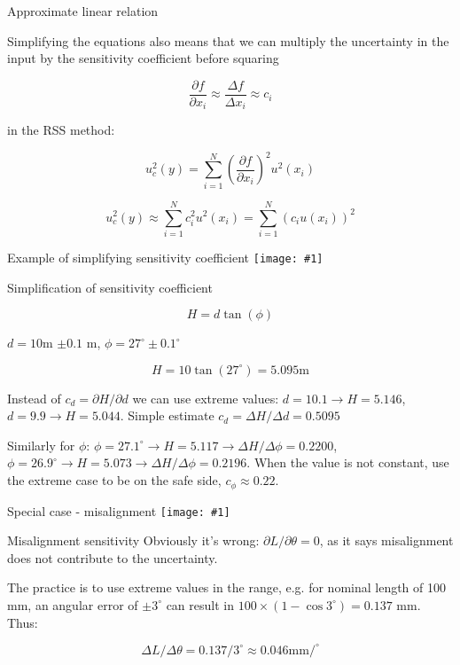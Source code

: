 \documentclass[12pt]{beamer}
\newcommand{\fig}[1]{\centering\texttt{[image: \#1]}}
\begin{document}
\begin{frame}{Approximate linear relation}

Simplifying the equations also means that we can multiply the uncertainty in the input by the sensitivity coefficient before squaring

\[ \frac{\partial f}{\partial x_i} \approx \frac{\Delta f}{\Delta x_i} \approx c_i \]

in the RSS method:

\[ u_c^2(y) = \sum\limits_{i=1}^{N} \left( \frac{\partial f}{\partial x_i} \right)^2 u^2(x_i) \]

\[ u_c^2(y) \approx \sum\limits_{i=1}^{N} c_i^2 u^2(x_i) = \sum\limits_{i=1}^{N} (c_i u(x_i))^2 \]

\end{frame}


\begin{frame}{Example of simplifying sensitivity coefficient}
\fig{Clinometer-Measurement-of-Flag-Pole}
\end{frame}

\begin{frame}{Simplification of sensitivity coefficient}

\[ H = d \tan(\phi) \]

$ d = 10$m $\pm 0.1$ m, $\phi = 27^\circ \pm 0.1^\circ$

\[ H = 10 \tan(27^\circ) = 5.095 \mathrm{m} \]

Instead of $c_d = \partial H/\partial d$ we can use extreme values: $d = 10.1 \to H = 5.146$, $d=9.9 \to H=5.044$. Simple estimate $c_d = \Delta H/\Delta d = 0.5095$ 

Similarly for $\phi$: $\phi = 27.1^\circ \to H = 5.117 \to \Delta H/\Delta \phi = 0.2200$, $\phi = 26.9^\circ \to H = 5.073 \to \Delta H/\Delta \phi = 0.2196$. When the value is not constant, use the extreme case to be on the safe side, $c_\phi \approx 0.22$. 

\end{frame}

\begin{frame}{Special case - misalignment}
\fig{cosine-sensitivity-combined}
\end{frame}

\begin{frame}{Misalignment sensitivity}
Obviously it's wrong: $\partial L/\partial \theta = 0$, as it says misalignment does not contribute to the uncertainty. 

The practice is to use extreme values in the range, e.g. for nominal length of 100 mm, an angular error of $\pm 3^\circ$ can result in $100 \times (1-\cos 3^\circ ) = 0.137$ mm. Thus:

\[ \Delta L/\Delta \theta = 0.137/3^\circ \approx 0.046 \mathrm{mm}/^\circ \] 

\end{frame}
\end{document}
